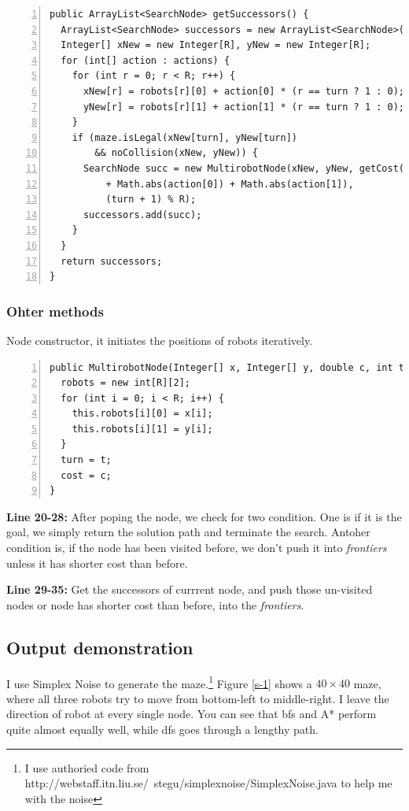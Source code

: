 \begin{lstlisting}[numbers=left]
public ArrayList<SearchNode> getSuccessors() {
  ArrayList<SearchNode> successors = new ArrayList<SearchNode>();
  Integer[] xNew = new Integer[R], yNew = new Integer[R];
  for (int[] action : actions) {
    for (int r = 0; r < R; r++) {
      xNew[r] = robots[r][0] + action[0] * (r == turn ? 1 : 0);
      yNew[r] = robots[r][1] + action[1] * (r == turn ? 1 : 0);
    }
    if (maze.isLegal(xNew[turn], yNew[turn])
        && noCollision(xNew, yNew)) {
      SearchNode succ = new MultirobotNode(xNew, yNew, getCost()
          + Math.abs(action[0]) + Math.abs(action[1]),
          (turn + 1) % R);
      successors.add(succ);
    }
  }
  return successors;
}
\end{lstlisting}



\subsubsection{Ohter methods}
Node constructor, it initiates the positions of robots iteratively.

\begin{lstlisting}[numbers=left]
public MultirobotNode(Integer[] x, Integer[] y, double c, int t) {
  robots = new int[R][2];
  for (int i = 0; i < R; i++) {
    this.robots[i][0] = x[i];
    this.robots[i][1] = y[i];
  }
  turn = t;
  cost = c;
}
\end{lstlisting}

\textbf{Line 20-28:} After poping the node, we check for two condition. One is if it is the goal, we simply return the solution path and terminate the search. Antoher condition is, if the node has been visited before, we don't push it into \emph{frontiers} unless it has shorter cost than before.

\textbf{Line 29-35:} Get the successors of currrent node, and push those un-visited nodes or node has shorter cost than before, into the \emph{frontiers}.



\subsection{Output demonstration}
I use Simplex Noise to generate the maze.\footnote{I use authoried code from http://webstaff.itn.liu.se/~stegu/simplexnoise/SimplexNoise.java to help me with the noise} Figure \ref{s-1} shows a $40\times40$ maze, where all three robots try to move from bottom-left to middle-right. I leave the direction of robot at every single node. You can see that bfs and A* perform quite almost equally well, while dfs goes through a lengthy path. 

